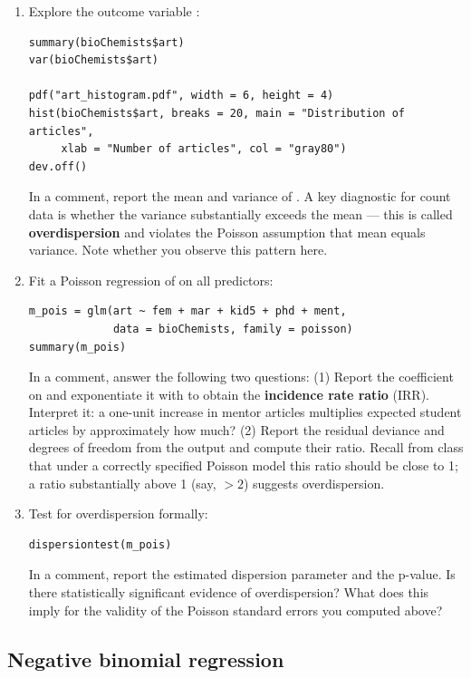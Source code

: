 \begin{enumerate}[label=\alph*)]

  \item Explore the outcome variable :
  \begin{lstlisting}
summary(bioChemists$art)
var(bioChemists$art)

pdf("art_histogram.pdf", width = 6, height = 4)
hist(bioChemists$art, breaks = 20, main = "Distribution of articles",
     xlab = "Number of articles", col = "gray80")
dev.off()
  \end{lstlisting}
  In a comment, report the mean and variance of . A key diagnostic for count data is whether the variance substantially exceeds the mean --- this is called \textbf{overdispersion} and violates the Poisson assumption that mean equals variance. Note whether you observe this pattern here.

  \item Fit a Poisson regression of  on all predictors:
  \begin{lstlisting}
m_pois = glm(art ~ fem + mar + kid5 + phd + ment,
             data = bioChemists, family = poisson)
summary(m_pois)
  \end{lstlisting}
  In a comment, answer the following two questions: (1) Report the coefficient on  and exponentiate it with  to obtain the \textbf{incidence rate ratio} (IRR). Interpret it: a one-unit increase in mentor articles multiplies expected student articles by approximately how much? (2) Report the residual deviance and degrees of freedom from the  output and compute their ratio. Recall from class that under a correctly specified Poisson model this ratio should be close to 1; a ratio substantially above 1 (say, $>2$) suggests overdispersion.

  \item Test for overdispersion formally:
  \begin{lstlisting}
dispersiontest(m_pois)
  \end{lstlisting}
  In a comment, report the estimated dispersion parameter and the p-value. Is there statistically significant evidence of overdispersion? What does this imply for the validity of the Poisson standard errors you computed above?

\end{enumerate}

\subsection{Negative binomial regression}

